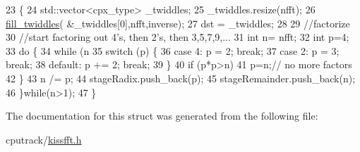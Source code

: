 \begin{DoxyCode}
23     \{
24         std::vector<cpx\_type> \_twiddles;
25         \_twiddles.resize(nfft);
26         \hyperlink{structkissfft__utils_1_1traits_a963aa6e0faf253b4db8cf348e1853c0c}{fill\_twiddles}( &\_twiddles[0],nfft,inverse);
27         dst = \_twiddles;
28 
29         \textcolor{comment}{//factorize}
30         \textcolor{comment}{//start factoring out 4's, then 2's, then 3,5,7,9,...}
31         \textcolor{keywordtype}{int} n= nfft;
32         \textcolor{keywordtype}{int} p=4;
33         \textcolor{keywordflow}{do} \{
34             \textcolor{keywordflow}{while} (n %
35                 \textcolor{keywordflow}{switch} (p) \{
36                     \textcolor{keywordflow}{case} 4: p = 2; \textcolor{keywordflow}{break};
37                     \textcolor{keywordflow}{case} 2: p = 3; \textcolor{keywordflow}{break};
38                     \textcolor{keywordflow}{default}: p += 2; \textcolor{keywordflow}{break};
39                 \}
40                 \textcolor{keywordflow}{if} (p*p>n)
41                     p=n;\textcolor{comment}{// no more factors}
42             \}
43             n /= p;
44             stageRadix.push\_back(p);
45             stageRemainder.push\_back(n);
46         \}\textcolor{keywordflow}{while}(n>1);
47     \}
\end{DoxyCode}


The documentation for this struct was generated from the following file\+:\begin{DoxyCompactItemize}
\item 
cputrack/\hyperlink{kissfft_8h}{kissfft.\+h}\end{DoxyCompactItemize}
